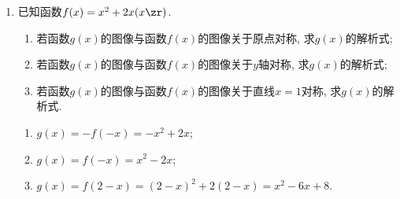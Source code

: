 \begin{enumerate}
\item 已知函数$f(x)=x^2+2x(x\zr)$. 
\begin{enumerate}[(1)]
\item 若函数$g(x)$的图像与函数$f(x)$的图像关于原点对称, 求$g(x)$的解析式;
\item 若函数$g(x)$的图像与函数$f(x)$的图像关于$y$轴对称, 求$g(x)$的解析式;
\item 若函数$g(x)$的图像与函数$f(x)$的图像关于直线$x=1$对称, 求$g(x)$的解析式.
\end{enumerate}
\begin{jieda}
\begin{enumerate}[(1)]
\item $g(x)=-f(-x)=-x^2+2x$; 
\item $g(x)=f(-x)=x^2-2x$; 
\item $g(x)=f(2-x)=(2-x)^2+2(2-x)=x^2-6x+8$. 
\end{enumerate}
\end{jieda}
\begin{vspace_}
    \vsp[3]
\end{vspace_}


\end{enumerate}
